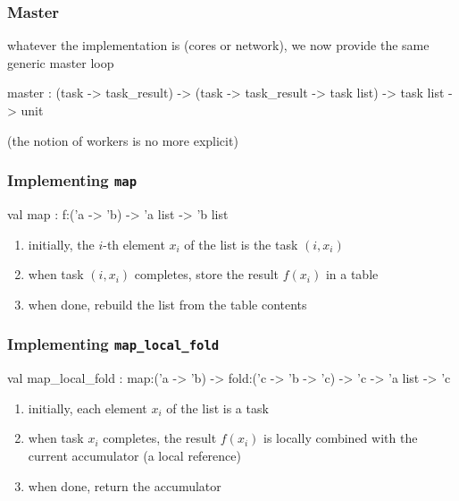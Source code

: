 \documentclass{beamer}
\let\emph\alert
\begin{document}
\begin{frame}\frametitle{Master}
  whatever the implementation is (cores or network), we now 
  provide the same generic master loop


  \begin{ocaml}
    master : (task -> task_result) -> 
             (task -> task_result -> task list) ->
             task list -> 
             unit
  \end{ocaml}


  (the notion of workers is no more explicit)
\end{frame}

\begin{frame}\frametitle{Implementing \texttt{map}}
  \begin{ocaml}
val map : f:('a -> 'b) -> 'a list -> 'b list
  \end{ocaml}



  \begin{enumerate}
  \item initially, the $i$-th element $x_i$ of the list is the task $(i,x_i)$
  \item when task $(i,x_i)$ completes, store the result $f(x_i)$ in a table
  \item when done, rebuild the list from the table contents
  \end{enumerate}
\end{frame}

\begin{frame}\frametitle{Implementing \texttt{map\_local\_fold}}
  \begin{ocaml}
 val map_local_fold :
  map:('a -> 'b) -> fold:('c -> 'b -> 'c) -> 
  'c -> 'a list -> 'c
  \end{ocaml}



  \begin{enumerate}
  \item initially, each element $x_i$ of the list is a task
  \item when task $x_i$ completes, the result $f(x_i)$ is
    \emph{locally} combined with the current accumulator (a local reference)
  \item when done, return the accumulator
  \end{enumerate}
\end{frame}
\end{document}
